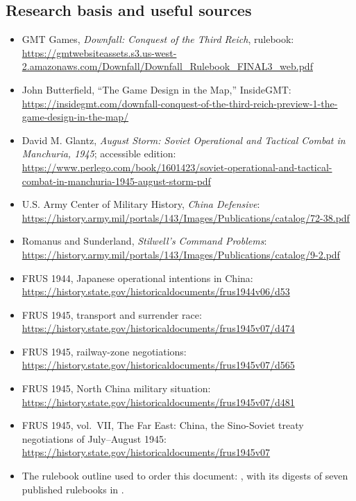 \documentclass[11pt]{article}
\begin{document}
\subsection{Research basis and useful sources}\label{sub:research}
\begin{itemize}\raggedright
\item GMT Games, \emph{Downfall: Conquest of the Third Reich}, rulebook: \url{https://gmtwebsiteassets.s3.us-west-2.amazonaws.com/Downfall/Downfall_Rulebook_FINAL3_web.pdf}
\item John Butterfield, ``The Game Design in the Map,'' InsideGMT: \url{https://insidegmt.com/downfall-conquest-of-the-third-reich-preview-1-the-game-design-in-the-map/}
\item David M. Glantz, \emph{August Storm: Soviet Operational and Tactical Combat in Manchuria, 1945}; accessible edition: \url{https://www.perlego.com/book/1601423/soviet-operational-and-tactical-combat-in-manchuria-1945-august-storm-pdf}
\item U.S. Army Center of Military History, \emph{China Defensive}: \url{https://history.army.mil/portals/143/Images/Publications/catalog/72-38.pdf}
\item Romanus and Sunderland, \emph{Stilwell's Command Problems}: \url{https://history.army.mil/portals/143/Images/Publications/catalog/9-2.pdf}
\item FRUS 1944, Japanese operational intentions in China: \url{https://history.state.gov/historicaldocuments/frus1944v06/d53}
\item FRUS 1945, transport and surrender race: \url{https://history.state.gov/historicaldocuments/frus1945v07/d474}
\item FRUS 1945, railway-zone negotiations: \url{https://history.state.gov/historicaldocuments/frus1945v07/d565}
\item FRUS 1945, North China military situation: \url{https://history.state.gov/historicaldocuments/frus1945v07/d481}
\item FRUS 1945, vol.\ VII, The Far East: China, the Sino-Soviet treaty negotiations of July--August 1945: \url{https://history.state.gov/historicaldocuments/frus1945v07}
\item The rulebook outline used to order this document: , with its digests of seven published rulebooks in .
\end{itemize}

\end{document}

